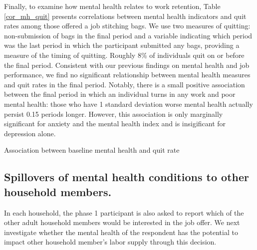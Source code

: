 \documentclass[12pt, a4paper, american]{article}
\begin{document}
Finally, to examine how mental health relates to work retention, Table \ref{cor_mh_quit} presents correlations between mental health indicators and quit rates among those offered a job stitching bags. We use two measures of quitting: non-submission of bags in the final period and a variable indicating which period was the last period in which the participant submitted any bags, providing a measure of the timing of quitting. Roughly 8\% of individuals quit on or before the final period. Consistent with our previous findings on mental health and job performance, we find no significant relationship between mental health measures and quit rates in the final period. Notably, there is a small positive association between the final period in which an individual turns in any work and poor mental health: those who have 1 standard deviation worse mental health actually persist 0.15 periods longer. However, this association is only marginally significant for anxiety and the mental health index and is insigificant for depression alone.  




\begin{table}[H]
\caption{Association between baseline mental health and quit rate}
\label{cor_mh_quit}
\centering
{}
\end{table}

\subsection{Spillovers of mental health conditions to other household members.}
In each household, the phase 1 participant is also asked to report which of the other adult household members would be interested in the job offer. We next investigate whether the mental health of the respondent has the potential to impact other household member's labor supply through this decision. 
\end{document}
